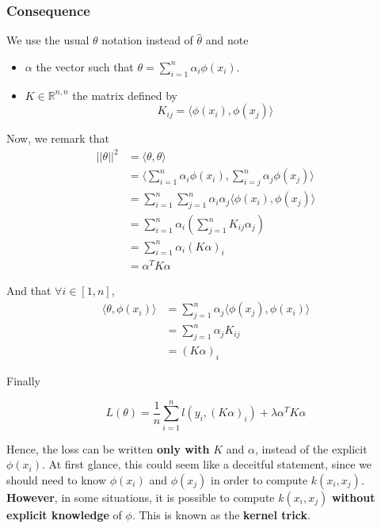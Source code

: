 \documentclass[
10pt, %
a4paper, %
oneside, %
headinclude,footinclude, %
BCOR5mm, %
]{scrartcl}
\begin{document}
\subsubsection{\large\color{Periwinkle}Consequence}

We use the usual $\theta$ notation instead of $\hat{\theta}$ and note
\begin{itemize}
    \item $\alpha$ the vector such that $\theta = \sum^{n}_{i=1} \alpha_i\phi(x_i)$.
    \item $K\in \mathbb{R}^{n ,n}$ the matrix defined by
	\begin{equation}
	    K_{ij} = \langle\phi(x_i), \phi(x_j) \rangle 
	\end{equation}
\end{itemize}

Now, we remark that
\begin{equation*}
    \begin{aligned}
	||\theta||^2&= \langle\theta, \theta \rangle\\
	&= \langle \sum^{n}_{i=1} \alpha_i\phi(x_i) , \sum^{n}_{i=j} \alpha_j\phi(x_j)\rangle\\
	&= \sum^{n}_{i=1} \sum^{n}_{j=1} \alpha_i\alpha_j \langle\phi(x_i), \phi(x_j) \rangle\\
	&= \sum^{n}_{i=1} \alpha_i (\sum^{n}_{j=1} K_{ij}\alpha_j)\\
	&= \sum^{n}_{i=1} \alpha_i (K\alpha)_i\\
	&= \alpha^TK\alpha
    \end{aligned}
\end{equation*}

And that $\forall i\in [1, n]$,
\begin{equation*}
    \begin{aligned}
	\langle\theta, \phi(x_i) \rangle&= \sum^{n}_{j=1} \alpha_j \langle\phi(x_j),\phi(x_i) \rangle\\
	&= \sum^{n}_{j=1} \alpha_j K_{ij}\\
	&= (K\alpha)_{i}
    \end{aligned}
\end{equation*}

Finally

\begin{equation}
    L(\theta) = \frac{1}{n} \sum^{n}_{i=1} l(y_i, (K\alpha)_i)+\lambda \alpha^TK\alpha
\end{equation}

Hence, the loss can be written \textbf{{only with }} $K$ and $\alpha$, instead of the explicit $\phi(x_i)$. At first glance, this could seem like a deceitful statement, since we should need to know $\phi(x_i)$ and $\phi(x_j)$ in order to compute $k(x_i, x_j)$. \textbf{{However}}, in some situations, it is possible to compute $k(x_i, x_j)$ \textbf{{without explicit knowledge}} of $\phi$. This is known as the \textbf{{kernel trick}}.
\\
\end{document}
